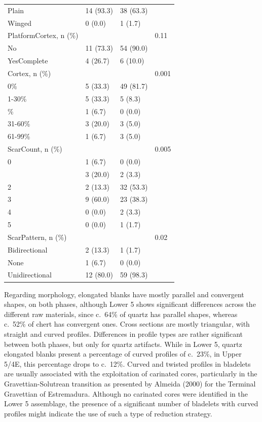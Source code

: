 \documentclass[12pt,twoside]{reedthesis}
\begin{document}
\begin{longtable}[t]{llll}
Plain & 14 (93.3) & 38 (63.3) & \\
Winged & 0 (0.0) & 1 (1.7) & \\
PlatformCortex, n (\%) &  &  & 0.11\\
\addlinespace
No & 11 (73.3) & 54 (90.0) & \\
YesComplete & 4 (26.7) & 6 (10.0) & \\
Cortex, n (\%) &  &  & 0.001\\
0\% & 5 (33.3) & 49 (81.7) & \\
1-30\% & 5 (33.3) & 5 (8.3) & \\
\addlinespace
100\% & 1 (6.7) & 0 (0.0) & \\
31-60\% & 3 (20.0) & 3 (5.0) & \\
61-99\% & 1 (6.7) & 3 (5.0) & \\
ScarCount, n (\%) &  &  & 0.005\\
0 & 1 (6.7) & 0 (0.0) & \\
\addlinespace
1 & 3 (20.0) & 2 (3.3) & \\
2 & 2 (13.3) & 32 (53.3) & \\
3 & 9 (60.0) & 23 (38.3) & \\
4 & 0 (0.0) & 2 (3.3) & \\
5 & 0 (0.0) & 1 (1.7) & \\
\addlinespace
ScarPattern, n (\%) &  &  & 0.02\\
Bidirectional & 2 (13.3) & 1 (1.7) & \\
None & 1 (6.7) & 0 (0.0) & \\
Unidirectional & 12 (80.0) & 59 (98.3) & \\
\bottomrule
\end{longtable}
Regarding morphology, elongated blanks have mostly parallel and convergent shapes, on both phases, although Lower 5 shows significant differences across the different raw materials, since c.~64\% of quartz has parallel shapes, whereas c.~52\% of chert has convergent ones. Cross sections are mostly triangular, with straight and curved profiles. Differences in profile types are rather significant between both phases, but only for quartz artifacts. While in Lower 5, quartz elongated blanks present a percentage of curved profiles of c.~23\%, in Upper 5/4E, this percentage drops to c.~12\%. Curved and twisted profiles in bladelets are usually associated with the exploitation of carinated cores, particularly in the Gravettian-Solutrean transition as presented by Almeida (2000) for the Terminal Gravettian of Estremadura. Although no carinated cores were identified in the Lower 5 assemblage, the presence of a significant number of bladelets with curved profiles might indicate the use of such a type of reduction strategy.
\end{document}
